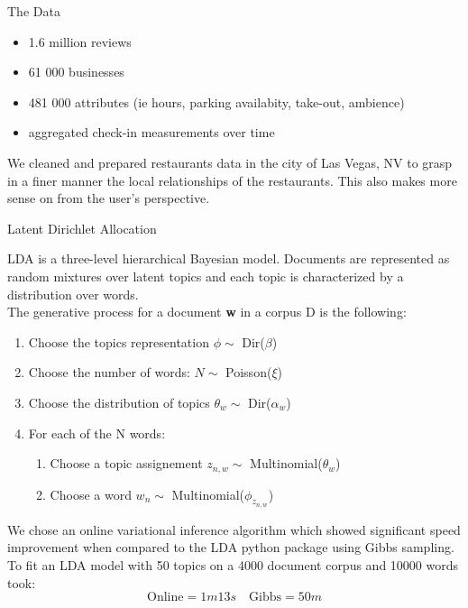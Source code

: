 \documentclass[final]{beamer}
\newlength{\onecolwid}
\begin{document}
\begin{frame}[t]
\begin{columns}[t]
\begin{column}{\onecolwid}
\begin{block}{The Data}
\small
\begin{itemize}
		\item 1.6 million reviews
		\item 61 000 businesses
		\item 481 000 attributes (ie hours, parking availabity, take-out, ambience)
		\item aggregated check-in measurements over time
\end{itemize}

We cleaned and prepared restaurants data in the city of Las Vegas, NV to grasp in a finer manner the local relationships of the restaurants. This also makes more sense on from the user's perspective.\\

\end{block}

\begin{block}{Latent Dirichlet Allocation}
\small

LDA \cite{LDA} is a three-level hierarchical Bayesian model. Documents are represented as random mixtures over latent topics and each topic is characterized by a distribution over words. \\
The generative process for a document \textbf{w} in a corpus D is the following:
\begin{enumerate}
	\item Choose the topics representation $\phi \sim$ Dir($\beta$)
	\item Choose the number of words: $ N \sim $ Poisson($ \xi $)
	\item Choose the distribution of topics $\theta_w \sim$ Dir($\alpha_w$)
	\item For each of the N words:
	\begin{enumerate}
		\item Choose a topic assignement $z_{n,w} \sim$ Multinomial($\theta_w$)
		\item Choose a word $w_n \sim$ Multinomial($\phi_{z_{n,w}}$)
	\end{enumerate}
\end{enumerate}
We chose an online variational inference algorithm \cite{OLLD} which showed significant speed improvement when compared to the LDA python package using Gibbs sampling. To fit an LDA model with 50 topics on a 4000 document corpus and 10000 words took:
$$ \text{Online} = 1m13s \quad \text{Gibbs} = 50m $$
\end{block}


\end{column}
\end{columns}
\end{frame}
\end{document}
